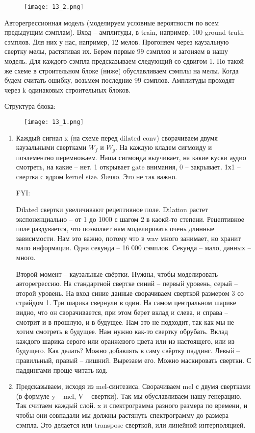 \begin{figure}[H]
	\centering
	\texttt{[image: 13\_2.png]}
	\label{fig:13_2}
\end{figure}


Авторегрессионная модель (моделируем условные вероятности по всем предыдущим сэмплам). Вход -- амплитуды, в train, например, 100 ground truth сэмплов. Для них у нас, например, 12 мелов. Прогоняем через каузальную свертку мелы, растягивая их. Берем первые 99 сэмплов и загоняем в нашу модель. Для каждого сэмпла предсказываем следующий со сдвигом 1. По такой же схеме в строительном блоке (ниже) обуславливаем сэмплы на мелы. Когда будем считать ошибку, возьмем последние 99 сэмплов. Амплитуды проходят через k одинаковых строительных блоков. 


Структура блока:

\begin{figure}[H]
	\centering
	\texttt{[image: 13\_1.png]}
	\label{fig:13_1}
\end{figure}



\begin{enumerate}
    \item Каждый сигнал x (на схеме перед dilated conv) сворачиваем двумя каузальными свертками $W_f$ и $W_g$. На каждую кладем сигмоиду и поэлементно перемножаем. Наша сигмоида выучивает, на какие куски аудио смотреть, на какие -- нет. 1 открывает gate внимания, 0 -- закрывает. 1х1 -- свертка с ядром kernel size. Яичко. Это не так важно.
    
    FYI:
    
    Dilated свертки увеличивают рецептивное поле. Dilation растет экспоненциально -- от 1 до 1000 с шагом 2 в каокй-то степени. Рецептивное поле раздувается, что позволяет нам моделировать очень длинные зависимости. Нам это важно, потому что в wav много занимает, но хранит мало информации. Одна секунда -- 16 000 сэмплов. Секунда -- мало, данных -- много.
    
    Второй момент -- каузальные свёртки. Нужны, чтобы моделировать авторегрессию. На стандартной свертке синий -- первый уровень, серый -- второй уровень. На вход синие данные сворачиваем сверткой размером 3 со страйдом 1. Три шарика свернули в один. На самом центральном шарике видно, что он сворачивается, при этом берет вклад и слева, и справа -- смотрит и в прошлую, и в будущее. Нам это не подходит, так как мы не хотим смотреть в будущее. Нам нужно как-то свертку обрубать. Вклад каждого шарика серого или оранжевого цвета или из настоящего, или из будущего. Как делать? Можно добавлять в саму свёртку паддинг. Левый -- правильный, правый -- лишний. Вырезаем его. Можно маскировать свертки. С паддингами проще читать код. 
    
   
    \item Предсказываем, исходя из mel-синтезиса. Сворачиваем mel с двумя свертками (в формуле y -- mel, V -- свертки). Так мы обуславливаем нашу генерацию. Так считаем каждый слой. x и спектрограмма разного размера по времени, и чтобы они совпадали мы должны растянуть спектрограмму до размера сэмпла. Это делается или transpose сверткой, или линейной интерполяцией.
\end{enumerate}

